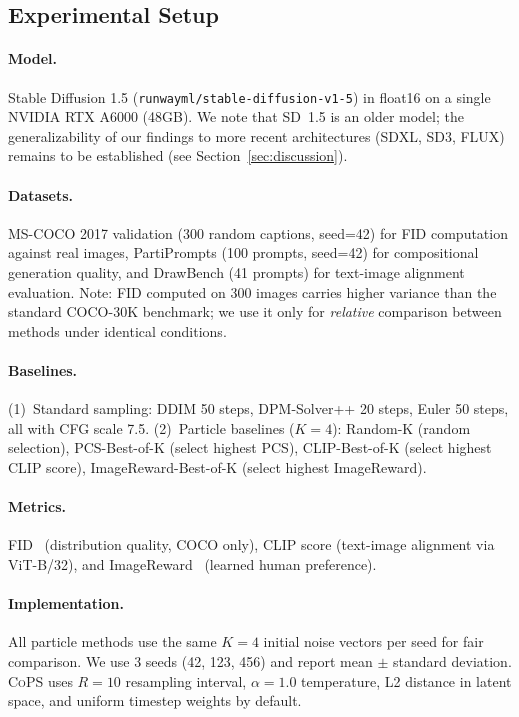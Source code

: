 \documentclass{article}
\newcommand{\cops}{\textsc{CoPS}}
\newcommand{\pcs}{\textsc{PCS}}
\begin{document}
\subsection{Experimental Setup}

\paragraph{Model.} Stable Diffusion 1.5 (\texttt{runwayml/stable-diffusion-v1-5}) in float16 on a single NVIDIA RTX A6000 (48GB). We note that SD~1.5 is an older model; the generalizability of our findings to more recent architectures (SDXL, SD3, FLUX) remains to be established (see Section~\ref{sec:discussion}).

\paragraph{Datasets.} MS-COCO 2017 validation (300 random captions, seed=42) for FID computation against real images, PartiPrompts (100 prompts, seed=42) for compositional generation quality, and DrawBench (41 prompts) for text-image alignment evaluation. Note: FID computed on 300 images carries higher variance than the standard COCO-30K benchmark; we use it only for \emph{relative} comparison between methods under identical conditions.

\paragraph{Baselines.} (1)~Standard sampling: DDIM 50 steps, DPM-Solver++ 20 steps, Euler 50 steps, all with CFG scale 7.5. (2)~Particle baselines ($K=4$): Random-K (random selection), PCS-Best-of-K (select highest \pcs{}), CLIP-Best-of-K (select highest CLIP score), ImageReward-Best-of-K (select highest ImageReward).

\paragraph{Metrics.} FID~\citep{heusel2017fid} (distribution quality, COCO only), CLIP score (text-image alignment via ViT-B/32), and ImageReward~\citep{xu2023imagereward} (learned human preference).

\paragraph{Implementation.} All particle methods use the same $K=4$ initial noise vectors per seed for fair comparison. We use 3 seeds (42, 123, 456) and report mean $\pm$ standard deviation. \cops{} uses $R=10$ resampling interval, $\alpha=1.0$ temperature, L2 distance in latent space, and uniform timestep weights by default.
\end{document}
